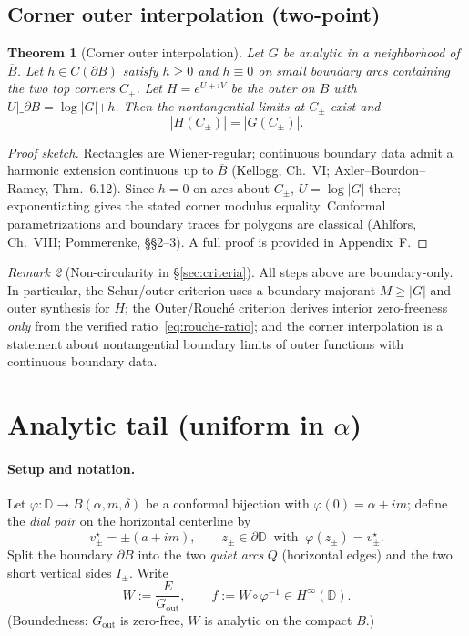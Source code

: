 \documentclass[11pt]{article}
\numberwithin{equation}{section}
\newtheorem{theorem}{Theorem}[section]
\theoremstyle{remark}
\newtheorem{remark}[theorem]{Remark}
\newcommand{\D}{\mathbb{D}}
\newcommand{\Gout}{G_{\mathrm{out}}}
\begin{document}
\subsection{Corner outer interpolation (two-point)}\label{subsec:corner-interp}

\begin{theorem}[Corner outer interpolation]\label{thm:corner-outer}
Let $G$ be analytic in a neighborhood of $\overline B$. Let $h\in C(\partial B)$ satisfy $h\ge 0$ and $h\equiv 0$ on small boundary arcs containing the two top corners $C_\pm$. Let $H=e^{U+iV}$ be the outer on $B$ with $U|\_{\partial B}=\log|G|+h$. Then the nontangential limits at $C_\pm$ exist and
\[
|H(C_\pm)|=|G(C_\pm)|.
\]
\end{theorem}

\begin{proof}[Proof sketch]
Rectangles are Wiener-regular; continuous boundary data admit a harmonic extension continuous up to $\overline B$ (Kellogg, Ch.~VI; Axler--Bourdon--Ramey, Thm.~6.12). Since $h=0$ on arcs about $C_\pm$, $U=\log|G|$ there; exponentiating gives the stated corner modulus equality. Conformal parametrizations and boundary traces for polygons are classical (Ahlfors, Ch.~VIII; Pommerenke, §§2–3). A full proof is provided in Appendix~F.
\end{proof}

\begin{remark}[Non-circularity in \S\ref{sec:criteria}]
All steps above are boundary-only. In particular, the Schur/outer criterion uses a boundary majorant $M\ge|G|$ and outer synthesis for $H$; the Outer/Rouch\'e criterion derives interior zero-freeness \emph{only} from the verified ratio~\eqref{eq:rouche-ratio}; and the corner interpolation is a statement about nontangential boundary limits of outer functions with continuous boundary data.
\end{remark}

\section{Analytic tail (uniform in \texorpdfstring{$\alpha$}{alpha})}\label{sec:tail}

\paragraph{Setup and notation.}
Let $\varphi:\D\to B(\alpha,m,\delta)$ be a conformal bijection with $\varphi(0)=\alpha+im$; define the \emph{dial pair} on the horizontal centerline by
\[
v_\pm^\star=\pm(a+im),\qquad z_\pm\in\partial\D\ \text{ with }\ \varphi(z_\pm)=v_\pm^\star.
\]
Split the boundary $\partial B$ into the two \emph{quiet arcs} $Q$ (horizontal edges) and the two short vertical sides $I_\pm$.
Write
\[
W:=\frac{E}{\Gout},\qquad f:=W\circ\varphi^{-1}\in H^\infty(\D).
\]
(Boundedness: $\Gout$ is zero-free, $W$ is analytic on the compact $B$.)
\end{document}
